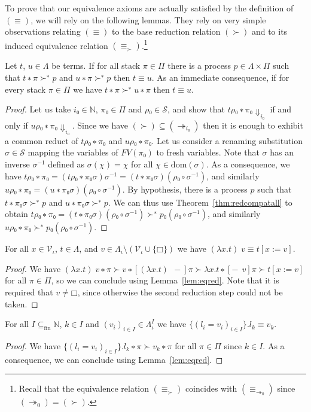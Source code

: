 To prove that our equivalence axioms are actually satisfied by the definition
of $(≡)$, we will rely on the following lemmas. They rely on very simple
observations relating $(≡)$ to the base reduction relation $(≻)$ and to its
induced equivalence relation $(≡_{≻})$.\footnote{Recall that the equivalence
relation $(≡_{≻})$ coincides with $(≡_{↠_0})$ since $(↠_0) = (≻)$.}
\begin{lemma}\label{lem:eqred}
  Let $t$, $u ∈ Λ$ be terms. If for all stack $π ∈ Π$ there is a process
  $p ∈ Λ×Π$ such that ${t ∗ π} ≻^{∗} p$ and ${u ∗ π} ≻^{∗} p$ then $t ≡ u$.
  As an immediate consequence, if for every stack $π ∈ Π$ we have
  ${t ∗ π} ≻^{∗} {u ∗ π}$ then $t ≡ u$.
\end{lemma}
\begin{proof}
  Let us take $i₀ ∈ \mathbb{N}$, $π₀ ∈ Π$ and $ρ₀ ∈ \mathcal{S}$, and show
  that ${tρ₀ ∗ π₀} {⇓}_{i₀}$ if and only if ${uρ₀ ∗ π₀ {⇓}_{i₀}}$. Since we
  have $(≻) ⊆ (↠_{i₀})$ then it is enough to exhibit a common reduct of
  $tρ₀ ∗ π₀$ and $uρ₀ ∗ π₀$.
  Let us consider a renaming substitution $σ ∈ \mathcal{S}$ mapping the
  variables of $FV(π₀)$ to fresh variables. Note that $σ$ has an inverse
  $σ^{-1}$ defined as $σ(χ) = χ$ for all $χ∈\text{dom}(σ)$. As a consequence,
  we have ${tρ₀ ∗ π₀} = {(tρ₀ ∗ π₀σ)σ^{-1}} = {(t ∗ π₀σ)(ρ₀ \circ σ^{-1})}$,
  and similarly ${uρ₀ ∗ π₀} = {(u ∗ π₀σ)(ρ₀ \circ σ^{-1})}$.
  By hypothesis, there is a process $p$ such that ${t ∗ π₀σ} ≻^{∗} p$ and
  ${u ∗ π₀σ} ≻^{∗} p$. We can thus use Theorem~\ref{thm:redcompatall} to
  obtain ${tρ₀∗π₀} = {(t ∗ π₀σ)(ρ₀ \circ σ^{-1})} ≻^{∗} p₀(ρ₀ \circ σ^{-1})$,
  and similarly ${uρ₀ ∗ π₀} ≻^{∗} p₀(ρ₀ \circ σ^{-1})$.
\end{proof}

\begin{theorem}
  For all $x ∈ \mathcal{V}_{ι}$, $t ∈ Λ$, and $v ∈ Λ_{ι} \setminus
  (\mathcal{V}_{ι} ∪ \{□\})$ we have $(λx.t)\;v ≡ t[x := v]$.
\end{theorem}
\begin{proof}
  We have ${(λx.t)\;v ∗ π} ≻ {v ∗ [(λx.t)\;\,{-}]π} ≻ {λx.t ∗ [{-}\;\,v]π} ≻
  t[x := v]$ for all $π ∈ Π$, so we can conclude using Lemma~\ref{lem:eqred}.
  Note that it is required that $v ≠ □$, since otherwise the second reduction
  step could not be taken.
\end{proof}

\begin{theorem}
  For all $I ⊆_{\text{fin}} \mathbb{N}$, $k ∈ I$ and $(v_i)_{i∈I} ∈ Λ_{ι}^I$ 
  we have $\{(l_i = v_i)_{i∈I}\}.l_k ≡ v_k$.
\end{theorem}
\begin{proof}
  We have ${\{(l_i = v_i)_{i∈I}\}.l_k ∗ π} ≻ {v_k ∗ π}$ for all $π ∈ Π$ since
  $k ∈ I$. As a consequence, we can conclude using Lemma~\ref{lem:eqred}.
\end{proof}

